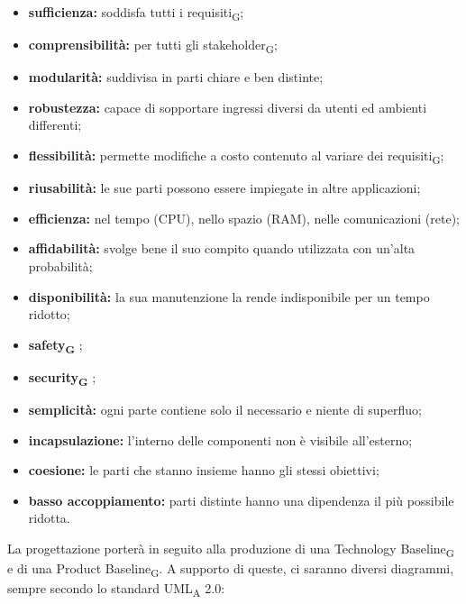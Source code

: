                 \begin{itemize}
                    \item \textbf{sufficienza: }soddisfa tutti i requisiti\textsubscript{G};
                    \item \textbf{comprensibilità: }per tutti gli stakeholder\textsubscript{G};
                    \item \textbf{modularità: }suddivisa in parti chiare e ben distinte;
                    \item \textbf{robustezza: }capace di sopportare ingressi diversi da utenti ed ambienti differenti;
                    \item \textbf{flessibilità: }permette modifiche a costo contenuto al variare dei requisiti\textsubscript{G};
                    \item \textbf{riusabilità: }le sue parti possono essere impiegate in altre applicazioni;
                    \item \textbf{efficienza: }nel tempo (CPU), nello spazio (RAM), nelle comunicazioni (rete);
                    \item \textbf{affidabilità: }svolge bene il suo compito quando utilizzata con un'alta probabilità;
                    \item \textbf{disponibilità: }la sua manutenzione la rende indisponibile per un tempo ridotto;
                    \item \textbf{ safety\textsubscript{G} };
                    \item \textbf{ security\textsubscript{G} };
                    \item \textbf{semplicità: }ogni parte contiene solo il necessario e niente di superfluo;
                    \item \textbf{incapsulazione: }l'interno delle componenti non è visibile all'esterno;
                    \item \textbf{coesione: }le parti che stanno insieme hanno gli stessi obiettivi;
                    \item \textbf{basso accoppiamento: }parti distinte hanno una dipendenza il più possibile ridotta.
                \end{itemize}
                La progettazione porterà in seguito alla produzione di una Technology Baseline\textsubscript{G} e di una Product Baseline\textsubscript{G}. A supporto di queste, ci saranno diversi diagrammi, sempre secondo lo standard UML\textsubscript{A} 2.0:
